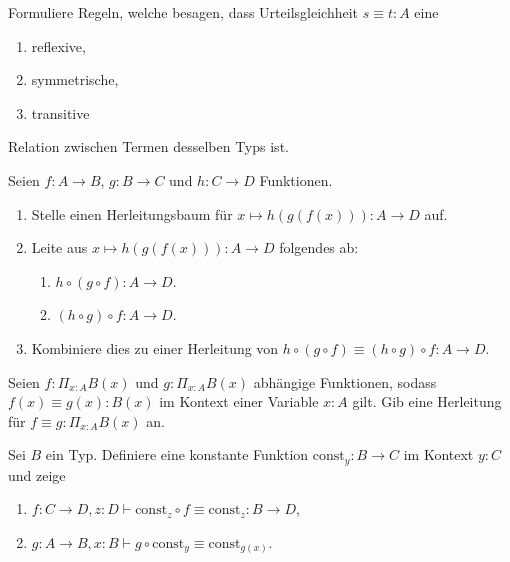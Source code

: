 \documentclass{uebung}
\begin{document}

\begin{exercise}
  Formuliere Regeln, welche besagen, dass Urteilsgleichheit $s\equiv t:A$ eine
  \begin{enumerate}
    \item reflexive,
    \item symmetrische,
    \item transitive
  \end{enumerate}
  Relation zwischen Termen desselben Typs ist.
\end{exercise}

\begin{exercise}
  Seien $f:A\to B$, $g:B\to C$ und $h:C\to D$ Funktionen.
  \begin{enumerate}
    \item Stelle einen Herleitungsbaum für $x\mapsto h(g(f(x))):A\to D$ auf.
    \item Leite aus $x\mapsto h(g(f(x))):A\to D$ folgendes ab:
      \begin{enumerate}
        \item $h\circ (g\circ f):A\to D$.
        \item $(h\circ g)\circ f:A\to D$.
      \end{enumerate}
    \item Kombiniere dies zu einer Herleitung von $h\circ(g\circ f)\equiv (h\circ g)\circ f:A\to D$.
  \end{enumerate}
\end{exercise}

\begin{exercise}
  Seien $f:\Pi_{x:A}B(x)$ und $g:\Pi_{x:A}B(x)$ abhängige Funktionen, sodass $f(x)\equiv g(x):B(x)$ im Kontext einer Variable $x:A$ gilt.
  Gib eine Herleitung für $f\equiv g:\Pi_{x:A}B(x)$ an.
\end{exercise}

\begin{exercise}
  Sei $B$ ein Typ.
  Definiere eine konstante Funktion $\mathrm{const}_y:B\to C$ im Kontext $y:C$ und zeige
  \begin{enumerate}
    \item $f:C\to D,z:D\vdash\mathrm{const}_z\circ f \equiv \mathrm{const}_z:B\to D$,
    \item $g:A\to B, x:B\vdash g\circ\mathrm{const}_y \equiv \mathrm{const}_{g(x)}$.
  \end{enumerate}
\end{exercise}
\end{document}
